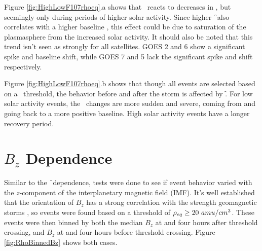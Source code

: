 Figure \ref{fig:HighLowF107rhoeq}.a shows that \req\ reacts to decreases in \dst, but seemingly only during periods of higher solar activity. Since higher \f\ also correlates with a higher baseline \req, this effect could be due to saturation of the plasmasphere from the increased solar activity. It should also be noted that this trend isn't seen as strongly for all satellites. GOES 2 and 6 show a significant spike and baseline shift, while GOES 7 and 5 lack the significant spike and shift respectively. 

Figure \ref{fig:HighLowF107rhoeq}.b shows that though all events are selected based on a \dst\ threshold, the behavior before and after the storm is affected by \f. For low solar activity events, the \dst\ changes are more sudden and severe, coming from and going back to a more positive baseline. High solar activity events have a longer recovery period.



\section{$B_z$ Dependence}

Similar to the \f\ dependence, tests were done to see if event behavior varied with the $z$-component of the interplanetary magnetic field (IMF). It's well established that the orientation of $B_z$ has a strong correlation with the strength geomagnetic storms , so events were found based on a threshold of $\rho_{eq} \geq 20~amu/cm^3$. These events were then binned by both the median $B_z$ at and four hours after threshold crossing, and $B_z$ at and four hours before threshold crossing. Figure \ref{fig:RhoBinnedBz} shows both cases.

